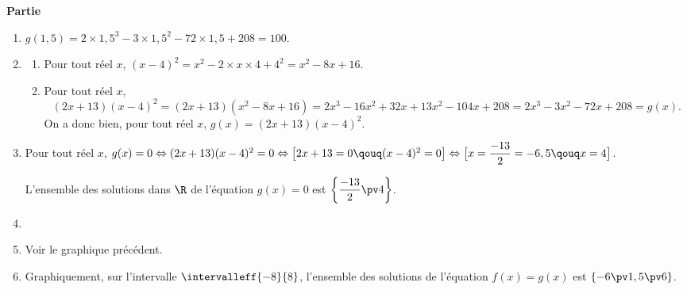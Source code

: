 \documentclass[10pt,french]{article}
\begin{document}
\medskip\textbf{Partie} 


\begin{enumerate}[label=\arabic*.]
    \item %
    $g(1,5)=2\times 1,5^3-3\times 1,5^2-72\times 1,5+208=100$.

    \item
        \begin{enumerate}[label=\alph*)]
        	\item Pour tout réel $x$, $(x-4)^2=x^2-2\times x\times 4+4^2=x^2-8x+16$.
        	
        	\item %
        	Pour tout réel $x$, \[(2x+13)(x-4)^2=(2x+13)(x^2-8x+16)=2x^3-16x^2+32x+13x^2-104x+208=2x^3-3x^2-72x+208=g(x).\]
        	On a donc bien, pour tout réel $x$, $g(x)=(2x+13)(x-4)^2$.
    	\end{enumerate}

    \item %
    Pour tout réel $x$, $g(x)=0\Leftrightarrow (2x+13)(x-4)^2=0\Leftrightarrow \big[ 2x+13=0\qouq (x-4)^2=0\big] \Leftrightarrow \big[ x=\dfrac{-13}{2}=-6,5\qouq x=4 \big]$.\par
    L'ensemble des solutions dans $\R$ de l'équation $g(x)=0$ est $\left\{\dfrac{-13}{2}\pv 4\right\}$.

    \item\strut %

    
    \item Voir le graphique précédent.
    
    \item Graphiquement, sur l'intervalle $\intervalleff{-8}{8}$, l'ensemble des solutions de l'équation $f(x)=g(x)$ est $\left\{-6\pv 1,5\pv 6\right\}$.
\end{enumerate}
\end{document}

